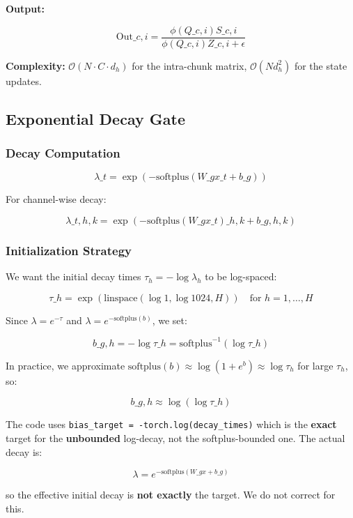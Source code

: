 \textbf{Output:}

\[
\text{Out}\_{c, i} = \frac{\phi(Q\_{c, i}) S\_{c, i}}{\phi(Q\_{c, i}) Z\_{c, i} + \epsilon}
\tag{4.9}
\]

\textbf{Complexity:} $\mathcal{O}(N \cdot C \cdot d_h)$ for the intra-chunk matrix, 
$\mathcal{O}(N d_h^2)$ for the state updates.

\subsection{Exponential Decay Gate}

\subsubsection{Decay Computation}

\[
\lambda\_t = \exp(-\text{softplus}(W\_g x\_t + b\_g))
\tag{4.10}
\]

For channel-wise decay:

\[
\lambda\_{t, h, k} = \exp(-\text{softplus}(W\_g x\_t)\_{h, k} + b\_{g, h, k})
\tag{4.11}
\]

\subsubsection{Initialization Strategy}

We want the initial decay times $\tau_{h} = -\log \lambda_h$ to be log-spaced:

\[
\tau\_h = \exp\!\left(\text{linspace}(\log 1, \log 1024, H)\right) \quad \text{for } h = 1, \dots, H
\tag{4.12}
\]

Since $\lambda = e^{-\tau}$ and $\lambda = e^{-\text{softplus}(b)}$, we set:

\[
b\_{g, h} = -\log \tau\_h = \text{softplus}^{-1}(\log \tau\_h)
\tag{4.13}
\]

In practice, we approximate $\text{softplus}(b) \approx \log(1 + e^b) \approx \log \tau_h$ for large $\tau_h$, so:

\[
b\_{g, h} \approx \log(\log \tau\_h)
\tag{4.14}
\]

The code uses \texttt{bias\_target = -torch.log(decay\_times)} which is the 
\textbf{exact} target for the \textbf{unbounded} log-decay, not the softplus-bounded one. The actual decay is:

\[
\lambda = e^{-\text{softplus}(W\_g x + b\_g)}
\]

so the effective initial decay is \textbf{not exactly} the target. We do not 
correct for this.

